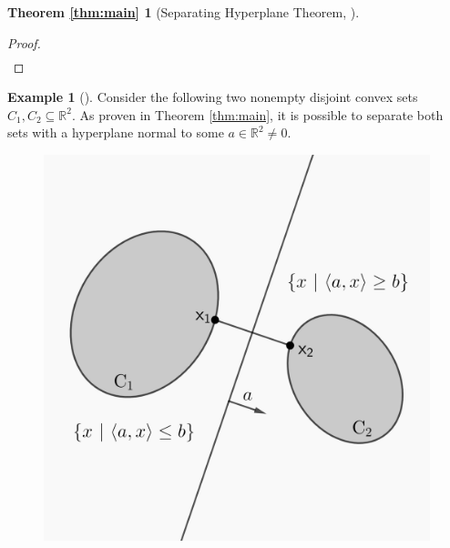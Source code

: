 \documentclass[11pt,reqno]{amsart}
\newcommand{\R}{\mathbb{R}}
\theoremstyle{plain}
\theoremstyle{definition}
\newtheorem{example}[theorem]{Example}
\newtheorem*{maintheorema}{Theorem \ref{thm:main}}
\begin{document}
{\begin{maintheorema}[{Separating Hyperplane Theorem, \cite[1.5.2]{bertsekas2009convex}}]
\begin{proof}
\begin{align*}
       \end{align*}
   \end{proof}
\end{maintheorema}
\smallskip
\begin{example}[{\cite[1.5.1]{bertsekas2009convex}}]
    Consider the following two nonempty disjoint convex sets $C_1,C_2\subseteq\R^2$. As proven in Theorem \ref{thm:main}, it is possible to separate both sets with a hyperplane normal to some $a\in\R^2\neq 0$.
    \begin{figure}[h]
    \centering
    \begin{minipage}{.5\textwidth}
      \centering
      \includegraphics[height = 1.7 in]{separating hyperplane.png}
      \label{fig:test1}
    \end{minipage}%
    \end{figure}
\end{example}
}
\end{document}
